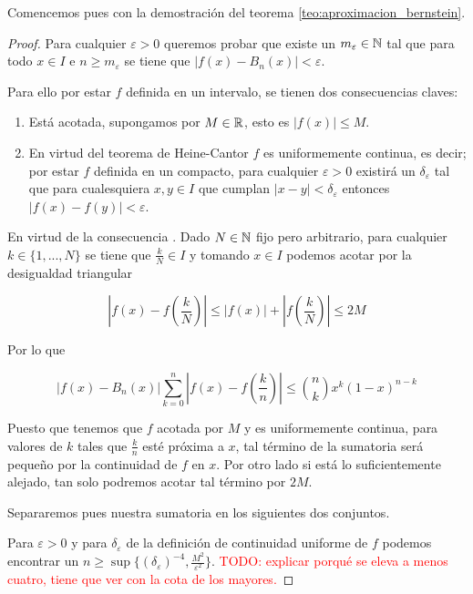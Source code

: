 Comencemos pues con la demostración del teorema \ref{teo:aproximacion_bernstein}.
\begin{proof}
    
    Para cualquier $\varepsilon > 0$ queremos probar que existe un $m_\varepsilon  \in \mathbb{N}$ tal que para 
    todo $x \in I$ e $n \geq m_\varepsilon$  se tiene que 
    $|f(x) - B_n(x)| < \varepsilon$.
    
     Para ello por estar $f$ definida en un intervalo, 
    se tienen dos consecuencias claves: 
    \begin{enumerate}
        \item Está acotada, supongamos por $M \in \mathbb{R}$, esto es $|f(x)| \leq M$. \label{consecuencia:M}
        \item En virtud del teorema de Heine-Cantor $f$ es uniformemente continua, es decir; por estar $f$ definida en un compacto,  para cualquier $\varepsilon >0$ existirá un $\delta_\varepsilon$
        tal que para cualesquiera $x,y \in I$ que cumplan $|x-y| < \delta_\varepsilon$ entonces $|f(x)-f(y)| < \varepsilon$. \label{consecuencia:delta}
    \end{enumerate}
    En virtud de la consecuencia . 
    Dado $N \in  \mathbb{N}$ fijo pero arbitrario, para cualquier $k \in \{1, ..., N\}$ se tiene que
    $\frac{k}{N} \in I$ y tomando $x \in I$ podemos acotar por la desigualdad triangular

    $$\left|f(x)- f\left( \frac{k}{N} \right) \right| \leq |f(x)| + \left|f \left( \frac{k}{N}\right) \right|\leq 2M$$  

    Por lo que 

    \begin{equation*}
        |f(x)-B_n(x)| \sum_{k=0}^n \left|f(x) - f \left( \frac{k}{n} \right)\right| \leq
     \binom{n}{k} x^{k} (1-x)^{n-k}
    \end{equation*}

    Puesto que tenemos que $f$ acotada por $M$ y es uniformemente continua, para valores de $k$ tales que $\frac{k}{n}$ 
    esté próxima a $x$, tal término de la sumatoria será pequeño por la continuidad de $f$ en $x$. Por otro lado
    si está lo suficientemente alejado, tan solo podremos acotar tal término por $2M$. 

    Separaremos pues nuestra sumatoria en los siguientes dos conjuntos.  

    Para $\varepsilon > 0$ y para $\delta_\varepsilon$ de la definición de continuidad uniforme de $f$ 
    podemos encontrar un $n \geq \sup \{ (\delta_\varepsilon)^{-4}, \frac{M^2}{ \varepsilon^2}\}$. 
    \textcolor{red}{ TODO: explicar porqué se eleva a menos cuatro, tiene que ver con la cota de los mayores.}


\end{proof}

